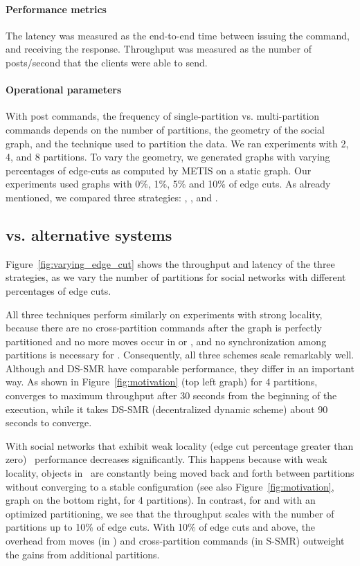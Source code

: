 \paragraph*{Performance metrics}
%
The latency was measured as the end-to-end time between issuing the
command, and receiving the response.  Throughput was measured as the
number of posts/second that the clients were able to send.

\paragraph*{Operational parameters}
%
With post commands, the frequency of single-partition
vs. multi-partition commands depends on the number of partitions, the
geometry of the social graph, and the technique used to partition the
data. We ran experiments with 2, 4, and 8 partitions.  To vary the
geometry, we generated graphs with varying percentages of edge-cuts as
computed by METIS on a static graph. Our experiments used graphs with
0\%, 1\%, 5\% and 10\% of edge cuts. As already mentioned, we compared 
three strategies: \ssmr{}, \dssmr, and \dynastar.


\subsection{\dynastar vs. alternative systems}
\label{sec:evaluation:results}

Figure~\ref{fig:varying_edge_cut} shows the throughput and latency of the three strategies, as we vary the number of partitions for social networks with different percentages of edge cuts.

All three techniques perform similarly on experiments with
strong locality, because there are no cross-partition commands after
the graph is perfectly partitioned and no more moves occur in
\dynastar or \dssmr, and no synchronization among partitions is
necessary for \ssmr.
Consequently, all three schemes scale remarkably well.
Although \dynastar and DS-SMR have comparable performance, they differ in an important way. 
As shown in Figure~\ref{fig:motivation} (top left graph) for 4 partitions, \dynastar converges to maximum throughput after 30 seconds from the beginning of the execution, while it takes DS-SMR (decentralized dynamic scheme) about 90 seconds to converge.

With social networks that exhibit weak locality (edge cut percentage greater than zero) \dssmr\ performance decreases significantly.  
This happens because with weak locality, objects in \dssmr\ are constantly being moved back and forth between partitions without converging to a stable configuration (see also Figure~\ref{fig:motivation}, graph on the bottom right, for 4 partitions). 
In contrast, for \dynastar and \ssmr with an optimized partitioning, we see that the throughput scales with the number of partitions up to 10\% of edge cuts. 
With 10\% of edge cuts and above, the overhead from moves (in \dynastar) and cross-partition commands (in S-SMR) outweight the gains from additional partitions.


